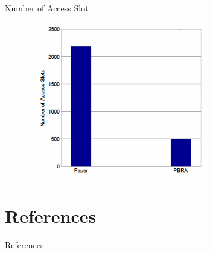 \documentclass{beamer}
\begin{document}
\begin{frame} {Number of Access Slot\cite{Zangar16}}
    \begin{figure}[t]
    \centering
    \includegraphics[width=0.7\textwidth]{figures/p5.png}
\end{figure}
\end{frame}


\section{References}
\calcreferencespagetotal %
\begin{frame}[allowframebreaks]{References}
    \fontsize{9pt}{13}\selectfont
    
    
\end{frame}
\end{document}
